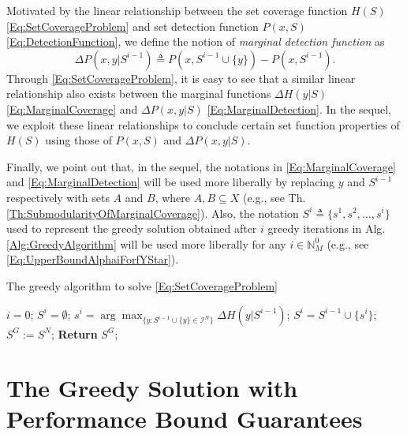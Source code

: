 \documentclass[letterpaper, 10 pt, conference]{ieeeconf}
\newcommand{\N}{\mathbb{N}}
\begin{document}
Motivated by the linear relationship between the set coverage function $H(S)$ \eqref{Eq:SetCoverageProblem} and set detection function $P(x,S)$ \eqref{Eq:DetectionFunction}, we define the notion of \emph{marginal detection function} as 
\begin{equation}\label{Eq:MarginalDetection}
    \Delta P(x, y \vert S^{i-1}) \triangleq P(x, S^{i-1}\cup\{y\}) - P(x, S^{i-1}).
\end{equation}
Through \eqref{Eq:SetCoverageProblem}, it is easy to see that a similar linear relationship also exists between the marginal functions $\Delta H(y \vert S)$ \eqref{Eq:MarginalCoverage} and $\Delta P(x,y\vert S)$ \eqref{Eq:MarginalDetection}. In the sequel, we exploit these linear relationships to conclude certain set function properties of $H(S)$ using those of $P(x,S)$ and $\Delta P(x,y\vert S)$. 

Finally, we point out that, in the sequel, the notations in \eqref{Eq:MarginalCoverage} and \eqref{Eq:MarginalDetection} will be used more liberally by replacing $y$ and $S^{i-1}$ respectively with sets $A$ and $B$, where $A,B\subseteq X$ (e.g., see Th. \ref{Th:SubmodularityOfMarginalCoverage}). Also, the notation $S^i \triangleq \{s^1,s^2,\ldots,s^i\}$ used to represent the greedy solution obtained after $i$ greedy iterations in Alg. \ref{Alg:GreedyAlgorithm} will be used more liberally for any $i\in\N_M^0$ (e.g., see \eqref{Eq:UpperBoundAlphaiForfYStar}). 


\begin{algorithm}[!h]
\caption{The greedy algorithm to solve \eqref{Eq:SetCoverageProblem}}\label{Alg:GreedyAlgorithm}
\begin{algorithmic}[1]
\State $i=0$; $S^i = \emptyset$;  
    \State $s^{i} = \arg \max_{\{y:S^{i-1} \cup \{y\} \in \mathcal{I}^N\}} \Delta H(y \vert S^{i-1})$; 
    \State $S^{i} = S^{i-1} \cup \{s^{i}\}$; 
\EndFor
\State $S^G := S^N$;  \textbf{Return} $S^G$;
\end{algorithmic}
\end{algorithm}




\section{The Greedy Solution with Performance Bound Guarantees}
\label{Sec:Preliminaries}
\end{document}
